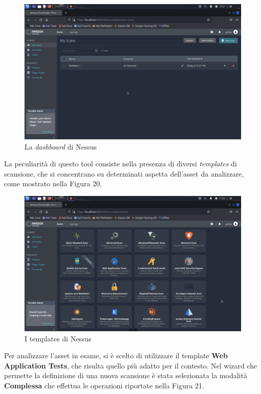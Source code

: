 \documentclass[a4paper, 12pt, oneside]{article}
\begin{document}
\begin{figure}[h!]
    \centering
    \includegraphics[width=\textwidth]{img/nessus-dashboard.png}
    \caption{La \textit{dashboard} di Nessus}
\end{figure}

La peculiarità di questo tool consiste nella presenza di diversi \textit{templates} di scansione, che si concentrano su determinati aspetta dell'asset da analizzare, come mostrato nella Figura 20.

\begin{figure}[h!]
    \centering
    \includegraphics[width=\textwidth]{img/nessus-templates.png}
    \caption{I templates di Nessus}
\end{figure}

Per analizzare l'asset in esame, si è scelto di utilizzare il template \textbf{Web Application Tests}, che risulta quello più adatto per il contesto. Nel wizard che permette la definizione di una nuova scansione è stata selezionata la modalità \textbf{Complessa} che effettua le operazioni riportate nella Figura 21.
\end{document}
